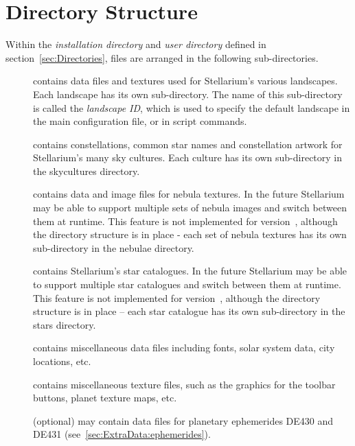 \section{Directory Structure}
\label{sec:FilesAndDirectories:DirectoryStructure}

Within the \emph{installation directory} and \emph{user directory}
defined in section~\ref{sec:Directories}, files are arranged in the
following sub-directories.

\begin{description}
\item[] contains data files and textures used for
  Stellarium's various landscapes. Each landscape has its own
  sub-directory. The name of this sub-directory is called the
  \emph{landscape ID}, which is used to specify the default landscape in
  the main configuration file, or in script commands.
\item[] contains constellations, common star names and
  constellation artwork for Stellarium's many sky cultures. Each culture
  has its own sub-directory in the skycultures directory.
\item[] contains data and image files for nebula textures.
  In the future Stellarium may be able to support multiple sets of nebula
  images and switch between them at runtime. This feature is not
  implemented for version~\StelVersion, although the directory structure is in
  place - each set of nebula textures has its own sub-directory in the
  nebulae directory.
\item[] contains Stellarium's star catalogues. In the
  future Stellarium may be able to support multiple star catalogues
  and switch between them at runtime. This feature is not implemented
  for version~\StelVersion, although the directory structure is in
  place -- each star catalogue has its own sub-directory in the stars
  directory.
\item[] contains miscellaneous data files including fonts,
  solar system data, city locations, etc.
\item[] contains miscellaneous texture files, such as the
  graphics for the toolbar buttons, planet texture maps, etc.
\item[] (optional) may contain data files for planetary
  ephemerides DE430 and DE431 (see~\ref{sec:ExtraData:ephemerides}).
\end{description}

